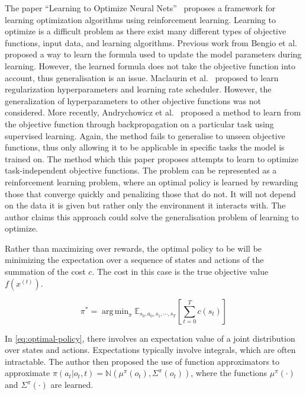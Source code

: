\documentclass{article}
\DeclareMathOperator*{\argmin}{arg\,min}
\begin{document}
The paper ``Learning to Optimize Neural Nets''~\cite{liLearningOptimizeNeural2017} proposes a framework for learning optimization algorithms using reinforcement learning. Learning to optimize is a difficult problem as there exist many different types of objective functions, input data, and learning algorithms. Previous work from Bengio et al.~\cite{LearningSynapticLearning} proposed a way to learn the formula used to update the model parameters during learning. However, the learned formula does not take the objective function into account, thus generalisation is an issue. Maclaurin et al.~\cite{maclaurinGradientbasedHyperparameterOptimization2015} proposed to learn regularization hyperparameters and learning rate scheduler. However, the generalization of hyperparameters to other objective functions was not considered. More recently, Andrychowicz et al.~\cite{andrychowiczLearningLearnGradient2016} proposed a method to learn from the objective function through backpropagation on a particular task using supervised learning. Again, the method fails to generalise to unseen objective functions, thus only allowing it to be applicable in specific tasks the model is trained on. The method which this paper proposes attempts to learn to optimize task-independent objective functions. The problem can be represented as a reinforcement learning problem, where an optimal policy is learned by rewarding those that converge quickly and penalizing those that do not. It will not depend on the data it is given but rather only the environment it interacts with. The author claims this approach could solve the generalisation problem of learning to optimize.

Rather than maximizing over rewards, the optimal policy to be will be minimizing the expectation over a sequence of states and actions of the summation of the cost $c$. The cost in this case is the true objective value $f(x^{(t)})$. 

\begin{equation}
    \pi^{*} = \argmin_{\pi} \mathbb{E}_{s_0, a_0, s_1, \cdots, s_T} [\sum_{t=0}^{T} c(s_t)]
    \label{eq:optimal-policy}
\end{equation}

In \cref{eq:optimal-policy}, there involves an expectation value of a joint distribution over states and actions. Expectations typically involve integrals, which are often intractable. The author then proposed the use of function approximators to approximate 
$\pi (a_t | o_t, t) = \mathbb{N} (\mu^{\pi} (o_t), \Sigma^{\pi} (o_t))$, where the functions $\mu^{\pi}(\cdot)$ and $\Sigma^{\pi} (\cdot)$ are learned.
\end{document}
